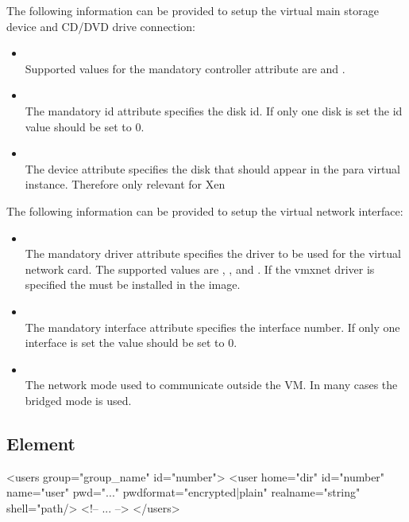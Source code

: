 \begin{itemize}
	The following information can be provided to setup the virtual
	main storage device and CD/DVD drive connection:

	\begin{itemize}
	\item {}\\
      Supported values for the mandatory controller attribute are 
      and .
	\item {}\\
      The mandatory id attribute specifies the disk id. If only one
      disk is set the id value should be set to 0.
	\item {}\\
      The device attribute specifies the disk that should appear
      in the para virtual instance. Therefore only relevant for Xen
	\end{itemize}

	The following information can be provided to setup the virtual
	network interface:

	\begin{itemize}
	\item {}\\
      The mandatory driver attribute specifies the driver to be used for
      the virtual network card. The supported values are ,
      , and . If the vmxnet driver is
      specified the  must be installed in the image.
	\item {}\\
      The mandatory interface attribute specifies the interface number. If
      only one interface is set the value should be set to 0.
	\item {}\\
      The network mode used to communicate outside the VM. In many cases
      the bridged mode is used.
	\end{itemize}
\end{itemize}

\subsection{ Element}
\begin{xml}
<users group="group_name" id="number">
  <user home="dir" id="number" name="user" pwd="..."
        pwdformat="encrypted|plain"
        realname="string" shell="path/>
  <!-- ... -->
</users>
\end{xml}

